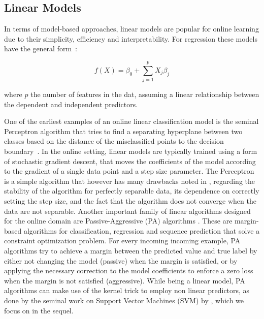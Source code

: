 \subsection*{Linear Models}
In terms of model-based approaches, linear models are popular
for online learning due to their simplicity, efficiency and interpretability.
For regression these models have the general form~\cite{esl}:

\begin{equation}
	f(X) = \beta_0 + \sum_{j=1}^{p}{X_j\beta_j}
\end{equation}

\noindent
where $p$ the number of features in the dat, assuming a linear relationship between the dependent and independent predictors.

One of the earliest examples of an online linear classification model is the seminal
Perceptron algorithm \cite{perceptron} that tries to find a separating hyperplane
between two classes based on the distance of the misclassified points to the
decision boundary~\cite{esl}.
In the online setting, linear models are typically trained using a form
of stochastic gradient descent, that moves the coefficients
of the model according to the gradient of a single data point
and a step size parameter.
The Perceptron is a simple algorithm that however has many drawbacks
noted in \cite{esl}, regarding the stability of the algorithm
for perfectly separable data, its dependence on correctly setting
the step size, and the fact that the algorithm does not
converge when the data are not separable.
Another important family of linear algorithms designed for the online domain
are Passive-Aggressive (PA) algorithms \cite{passive-aggressive}.
These are margin-based algorithms for classification, regression and
sequence prediction that solve a constraint optimization problem.
For every incoming incoming example, PA algorithms
try to achieve a margin between the predicted value and true label
by either not changing the model (passive) when the margin is satisfied,
or by applying the necessary correction to the model coefficients
to enforce a zero loss when the margin is not satisfied (aggressive).
While being a linear model, PA algorithms can make use of the kernel trick to
employ non linear predictors, as done by the seminal work
on Support Vector Machines (SVM) by \citet{svm-book}, which we
focus on in the sequel.

